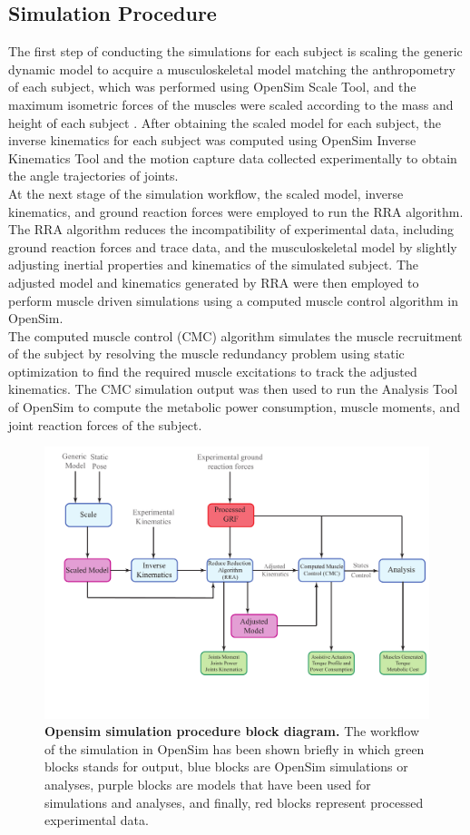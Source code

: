 \documentclass[10pt,letterpaper]{article}
\begin{document}
\subsection*{Simulation Procedure}
The first step of conducting the simulations for each subject is scaling the generic dynamic model to acquire a musculoskeletal model matching the anthropometry of each subject, which was performed using OpenSim Scale Tool, and the maximum isometric forces of the muscles were scaled according to the mass and height of each subject \cite{93}. After obtaining the scaled model for each subject, the inverse kinematics for each subject was computed using OpenSim Inverse Kinematics Tool and the motion capture data collected experimentally to obtain the angle trajectories of joints.\\
At the next stage of the simulation workflow, the scaled model, inverse kinematics, and ground reaction forces were employed to run the RRA algorithm\cite{103}. The RRA algorithm reduces the incompatibility of experimental data, including ground reaction forces and trace data, and the musculoskeletal model by slightly adjusting inertial properties and kinematics of the simulated subject. The adjusted model and kinematics generated by RRA were then employed to perform muscle driven simulations using a computed muscle control algorithm in OpenSim\cite{104}.\\
The computed muscle control (CMC) algorithm simulates the muscle recruitment of the subject by resolving the muscle redundancy problem using static optimization to find the required muscle excitations to track the adjusted kinematics. The CMC simulation output was then used to run the Analysis Tool of OpenSim to compute the metabolic power consumption, muscle moments, and joint reaction forces of the subject.\\
\begin{figure}[ht]
	\includegraphics[width=\linewidth]{Cartoons/OpenSim.pdf} 
	\vspace{-5mm}
	\caption{\small{\textbf{Opensim simulation procedure block diagram.} The workflow of the simulation in OpenSim has been shown briefly in which green blocks stands for output, blue blocks are OpenSim simulations or analyses, purple blocks are models that have been used for simulations and analyses, and finally, red blocks represent processed experimental data.}}
	\label{Fig_OpenSim_Sim_Procedure}
\end{figure}
\end{document}
